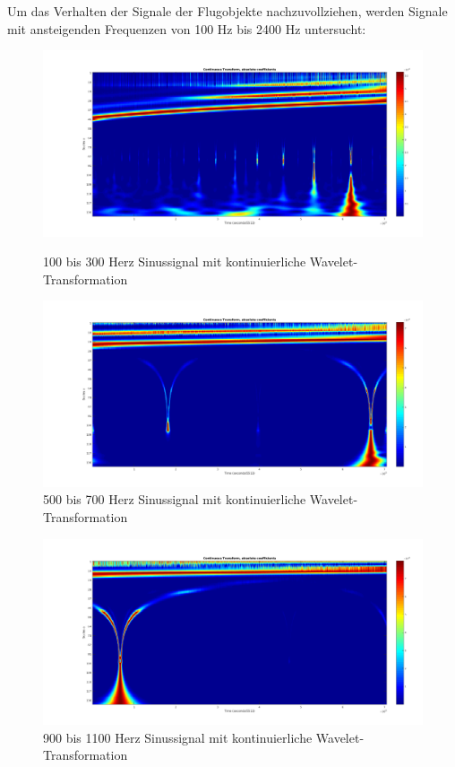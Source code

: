 \begin{refsection}
\newpage
Um das Verhalten der Signale der Flugobjekte nachzuvollziehen, werden Signale mit ansteigenden Frequenzen von 100 Hz bis 2400 Hz untersucht:
\begin{figure}[h]
	\centering
	\includegraphics[width=0.9\linewidth]{papers/meteor/images/anomalie/sweep/cwt_0100to0300hz.png}
	\caption{100 bis 300 Herz Sinussignal mit kontinuierliche Wavelet-Transformation}
	\includegraphics[width=0.9\linewidth]{papers/meteor/images/anomalie/sweep/cwt_0500to0700hz.png}
	\caption{500 bis 700 Herz Sinussignal mit kontinuierliche Wavelet-Transformation}
	\label{fig:cwt_anomalie_beam_1}
\end{figure}
\newpage
\begin{figure}[h]
	\centering
	\includegraphics[width=0.9\linewidth]{papers/meteor/images/anomalie/sweep/cwt_0900to1100hz.png}
	\caption{900 bis 1100 Herz Sinussignal mit kontinuierliche Wavelet-Transformation}

\end{figure}
\end{refsection}
